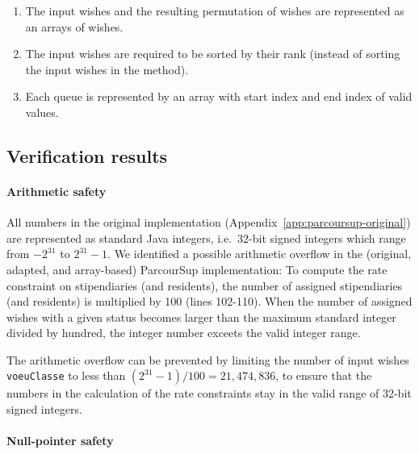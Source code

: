 \documentclass[a4paper]{report}
\newcommand{\aref}[1]{Appendix~\ref{#1}}
\begin{document}
\begin{enumerate}
\item The input wishes and the resulting permutation of wishes are represented
  as an arrays of wishes.
\item The input wishes are required to be sorted by their rank (instead of
  sorting the input wishes in the method).
\item Each queue is represented by an array with start index and end index of
  valid values.
\end{enumerate}

\subsection{Verification results}
\label{sec:parcoursup-openjml}

\paragraph{Arithmetic safety}

All numbers in the original implementation (\aref{app:parcoursup-original}) are
represented as standard Java integers, i.e.\ 32-bit signed integers which range
from $-2^{31}$ to $2^{31}-1$. We identified a possible arithmetic overflow in
the (original, adapted, and array-based) ParcourSup implementation: To compute
the rate constraint on stipendiaries (and residents), the number of assigned
stipendiaries (and residents) is multiplied by 100 (lines 102-110). When the
number of assigned wishes with a given status becomes larger than the maximum
standard integer divided by hundred, the integer number exceets the valid
integer range.

The arithmetic overflow can be prevented by limiting the number of input wishes
\texttt{voeuClasse} to less than $(2^{31}-1) / 100 = 21,474,836$, to ensure that
the numbers in the calculation of the rate constraints stay in the valid range
of 32-bit signed integers.

\paragraph{Null-pointer safety}
\end{document}
